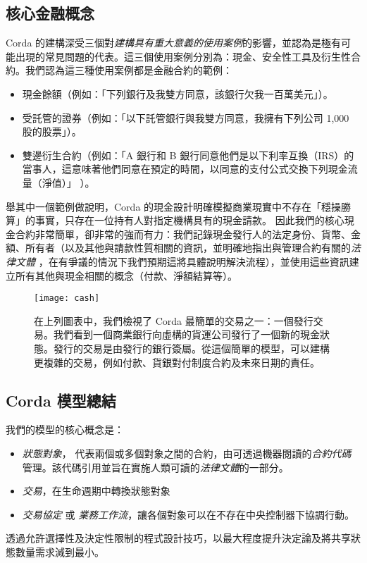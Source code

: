 ﻿\documentclass{article}
\begin{document}
\subsection{核心金融概念}
Corda 的建構深受三個對\textit{建構具有重大意義的使用案例}的影響，並認為是極有可能出現的常見問題的代表。這三個使用案例分別為：現金、安全性工具及衍生性合約。我們認為這三種使用案例都是金融合約的範例：
\begin{itemize}
\item 現金餘額（例如：「下列銀行及我雙方同意，該銀行欠我一百萬美元」）。
\item 受託管的證券（例如：「以下託管銀行與我雙方同意，我擁有下列公司 1,000 股的股票」）。
\item 雙邊衍生合約（例如：「A 銀行和 B 銀行同意他們是以下利率互換（IRS）的當事人，這意味著他們同意在預定的時間，以同意的支付公式交換下列現金流量（淨值）」 ）。
\end{itemize}
舉其中一個範例做說明，Corda 的現金設計明確模擬商業現實中不存在「穩操勝算」的事實，只存在一位持有人對指定機構具有的現金請款。\cite{BOE} 因此我們的核心現金合約非常簡單，卻非常的強而有力：我們記錄現金發行人的法定身份、貨幣、金額、所有者（以及其他與請款性質相關的資訊，並明確地指出與管理合約有關的\textit{法律文體} ，在有爭議的情況下我們預期這將具體說明解決流程），並使用這些資訊建立所有其他與現金相關的概念（付款、淨額結算等）。
\begin{figure}[H]
\texttt{[image: cash]}
\caption{在上列圖表中，我們檢視了 Corda 最簡單的交易之一：一個發行交易。我們看到一個商業銀行向虛構的貨運公司發行了一個新的現金狀態。發行的交易是由發行的銀行簽屬。從這個簡單的模型，可以建構更複雜的交易，例如付款、貨銀對付制度合約及未來日期的責任。}
\end{figure}
\subsection{Corda 模型總結}
我們的模型的核心概念是：
\begin{itemize}
\item \textit{狀態對象}， 代表兩個或多個對象之間的合約，由可透過機器閱讀的\textit{合約代碼}管理。該代碼引用並旨在實施人類可讀的\textit{法律文體}的一部分。\item \textit{交易}，在生命週期中轉換狀態對象
\item \textit{交易協定} 或 \textit{業務工作流}，讓各個對象可以在不存在中央控制器下協調行動。
\end{itemize}

透過允許選擇性及決定性限制的程式設計技巧，以最大程度提升決定論及將共享狀態數量需求減到最小。
\end{document}
